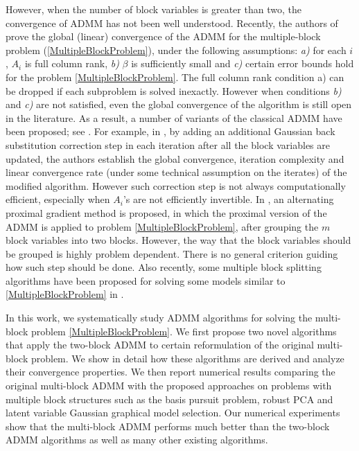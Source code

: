 \documentclass{mcom-l}
\theoremstyle{definition}
\theoremstyle{remark}
\numberwithin{equation}{section}
\begin{document}
However, when the number of block variables is greater than two, the convergence of ADMM has not been well understood. Recently, the authors of \cite{HongLuo2012} prove the global (linear) convergence of the ADMM for the multiple-block problem (\ref{MultipleBlockProblem}), under the following assumptions: {\it a)} for each $i$, $A_i$ is full column rank, {\it b)} $\beta$ is sufficiently small and {\it c)} certain error bounds hold for the problem \eqref{MultipleBlockProblem}. The full column rank condition a) can be dropped if each subproblem is solved inexactly. However when conditions {\it b)} and {\it c)} are not satisfied, even the global convergence of the algorithm is still open in the literature. As a result, a number of variants of the classical ADMM have been proposed; see \cite{HanYuanZhang2013,HeTaoYuan2012,HeTaoYuan2012further,Ma2012}. For example, in \cite{HeTaoYuan2012,HeTaoYuan2012further}, by adding an additional Gaussian back substitution correction step in each iteration after all the block variables are updated, the authors
establish the global convergence, iteration complexity and linear convergence rate (under some technical assumption on the iterates) of the modified algorithm. However such correction step is not always computationally efficient, especially when $A_i$'s are not efficiently invertible. In \cite{Ma2012}, an alternating proximal gradient method is proposed, in which the proximal version of the ADMM is applied to problem \eqref{MultipleBlockProblem}, after grouping the $m$ block variables into two blocks. However, the way that the block variables should be grouped is highly problem dependent. There is no general criterion guiding how such step should be done. Also recently, some multiple block splitting algorithms have been proposed for solving some models similar to \eqref{MultipleBlockProblem} in \cite{EcksteinSvaiter2009,GoldfarbMa2012}.

In this work, we systematically study ADMM algorithms for solving the  multi-block problem \eqref{MultipleBlockProblem}. We first propose two novel algorithms that apply the two-block ADMM to certain reformulation of the original multi-block problem. We show in detail how these algorithms are derived and analyze their convergence properties. We then report numerical results comparing the original multi-block ADMM with the proposed approaches on problems with multiple block structures such as the basis pursuit problem, robust PCA and latent variable Gaussian graphical model selection. Our numerical experiments show that the multi-block ADMM performs much better than the two-block ADMM algorithms as well as many other existing algorithms.
\end{document}
